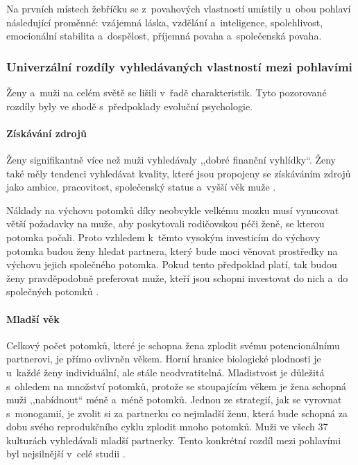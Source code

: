 \documentclass[a4paper, 12pt, notitlepage, oneside, numbers=noenddot]{report}
\begin{document}
Na prvních místech žebříčku se z~povahových vlastností umístily u~obou
pohlaví následující proměnné: vzájemná láska, vzdělání a~inteligence,
spolehlivost, emocionální stabilita a~dospělost, pří\-jem\-ná povaha
a~společenská povaha.

\subsubsection{Univerzální rozdíly vyhledávaných vlastností mezi pohlavími}

Ženy a~muži na celém světě se lišili v~řadě charakteristik.  Tyto
pozorované rozdíly byly ve shodě s~předpoklady evoluční psychologie.

\paragraph{Získávání zdrojů}

Ženy signifikantně více než muži vyhledávaly ,,dobré finanční
vy\-hlídky``.  Ženy také měly tendenci vyhledávat kvality, které jsou
propojeny se získáváním zdrojů jako ambice, pracovitost, společenský
status a~vyšší věk muže \citep{Buss2007}.

Náklady na výchovu potomků díky neobvykle velkému mozku musí vynucovat
větší požadavky na muže, aby poskytovali rodičovskou péči ženě, se
kterou potomka počali.  Proto vzhledem k~těmto vysokým investicím do
výchovy potomka budou ženy hledat partnera, který bude moci věnovat
prostředky na výchovu jejich společného potomka.  Pokud tento
předpoklad platí, tak budou ženy pravděpodobně preferovat muže, kteří
jsou schopni investovat do nich a~do společných potomků
\citep{Trivers1972,Ridley2007}.

\paragraph{Mladší věk}

Celkový počet potomků, které je schopna žena zplodit svému
poten\-cionál\-ní\-mu partnerovi, je přímo ovlivněn věkem.  Horní hranice
biologické plodnosti je u~každé ženy individuální, ale stále
neodvratitelná.  Mladistvost je důležitá s~ohledem na množství
potomků, protože se stoupajícím věkem je žena schopná muži
,,nabídnout`` méně a~méně potomků.  Jednou ze strategií, jak se
vyrovnat s~monogamií, je zvolit si za partnerku co nejmladší ženu,
která bude schopná za dobu svého reprodukčního cyklu zplodit mnoho
potomků.  Muži ve všech 37 kulturách vyhledávali mladší partnerky.
Tento konkrétní rozdíl mezi pohlavími byl nejsilnější v~celé studii
\citep{BussEtAl1990, Buss2007}.
\end{document}
